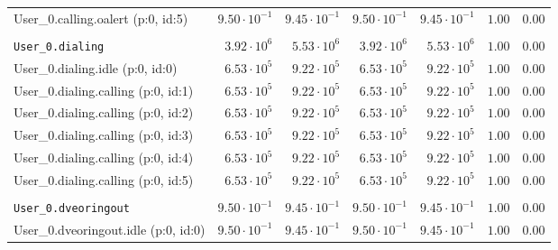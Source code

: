 \begin{table}[htbp]
{\begin{tabular}{lrrrrrr}
\hspace{3mm}User\_0.calling.oalert (p:0, id:5)       & $9.50 \cdot 10^{-1}$ & $9.45 \cdot 10^{-1}$ & $9.50 \cdot 10^{-1}$ & $9.45 \cdot 10^{-1}$ &               $1.00$ &               $0.00$ \\
\\[-8pt]\texttt{User\_0.dialing}                     &  $3.92 \cdot 10^{6}$ &  $5.53 \cdot 10^{6}$ &  $3.92 \cdot 10^{6}$ &  $5.53 \cdot 10^{6}$ &               $1.00$ &               $0.00$ \\
\hspace{3mm}User\_0.dialing.idle (p:0, id:0)         &  $6.53 \cdot 10^{5}$ &  $9.22 \cdot 10^{5}$ &  $6.53 \cdot 10^{5}$ &  $9.22 \cdot 10^{5}$ &               $1.00$ &               $0.00$ \\
\hspace{3mm}User\_0.dialing.calling (p:0, id:1)      &  $6.53 \cdot 10^{5}$ &  $9.22 \cdot 10^{5}$ &  $6.53 \cdot 10^{5}$ &  $9.22 \cdot 10^{5}$ &               $1.00$ &               $0.00$ \\
\hspace{3mm}User\_0.dialing.calling (p:0, id:2)      &  $6.53 \cdot 10^{5}$ &  $9.22 \cdot 10^{5}$ &  $6.53 \cdot 10^{5}$ &  $9.22 \cdot 10^{5}$ &               $1.00$ &               $0.00$ \\
\hspace{3mm}User\_0.dialing.calling (p:0, id:3)      &  $6.53 \cdot 10^{5}$ &  $9.22 \cdot 10^{5}$ &  $6.53 \cdot 10^{5}$ &  $9.22 \cdot 10^{5}$ &               $1.00$ &               $0.00$ \\
\hspace{3mm}User\_0.dialing.calling (p:0, id:4)      &  $6.53 \cdot 10^{5}$ &  $9.22 \cdot 10^{5}$ &  $6.53 \cdot 10^{5}$ &  $9.22 \cdot 10^{5}$ &               $1.00$ &               $0.00$ \\
\hspace{3mm}User\_0.dialing.calling (p:0, id:5)      &  $6.53 \cdot 10^{5}$ &  $9.22 \cdot 10^{5}$ &  $6.53 \cdot 10^{5}$ &  $9.22 \cdot 10^{5}$ &               $1.00$ &               $0.00$ \\
\\[-8pt]\texttt{User\_0.dveoringout}                 & $9.50 \cdot 10^{-1}$ & $9.45 \cdot 10^{-1}$ & $9.50 \cdot 10^{-1}$ & $9.45 \cdot 10^{-1}$ &               $1.00$ &               $0.00$ \\
\hspace{3mm}User\_0.dveoringout.idle (p:0, id:0)     & $9.50 \cdot 10^{-1}$ & $9.45 \cdot 10^{-1}$ & $9.50 \cdot 10^{-1}$ & $9.45 \cdot 10^{-1}$ &               $1.00$ &               $0.00$ \\

\end{tabular}}
\end{table}
